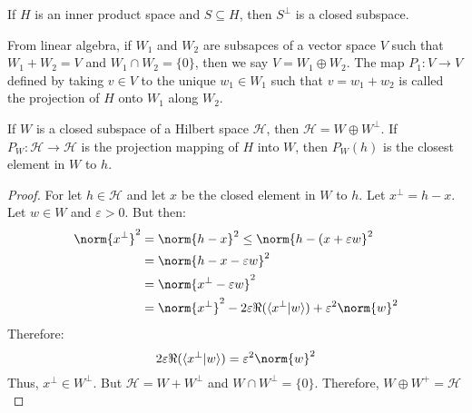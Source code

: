 \documentclass[crop=false,class=book,oneside]{standalone}                      %
\begin{document}
        \begin{theorem}
            If $H$ is an inner product space and
            $S\subseteq{H}$, then $S^{\perp}$ is a closed
            subspace.
        \end{theorem}
        From linear algebra, if $W_{1}$ and $W_{2}$ are
        subsapces of a vector space $V$ such that
        $W_{1}+W_{2}=V$ and $W_{1}\cap{W}_{2}=\{0\}$, then
        we say $V=W_{1}\oplus{W}_{2}$. The map
        $P_{1}:V\rightarrow{V}$ defined by taking $v\in{V}$ to
        the unique $w_{1}\in{W}_{1}$ such that
        $v=w_{1}+w_{2}$ is called the projection of $H$
        onto $W_{1}$ along $W_{2}$.
        \begin{theorem}
            If $W$ is a closed subspace of a Hilbert space
            $\mathcal{H}$, then
            $\mathcal{H}=W\oplus{W}^{\perp}$. If
            $P_{W}:\mathcal{H}\rightarrow\mathcal{H}$ is the
            projection mapping of $H$ into $W$, then
            $P_{W}(h)$ is the closest element in $W$ to $h$.
        \end{theorem}
        \begin{proof}
            For let $h\in\mathcal{H}$ and let $x$ be the
            closed element in $W$ to $h$. Let
            $x^{\perp}=h-x$. Let $w\in{W}$ and
            $\varepsilon>0$. But then:
            \begin{subequations}
                \begin{align}
                    \norm{x^{\perp}}^{2}
                    &=\norm{h-x}^{2}\leq
                    \norm{h-(x+\varepsilon{w}}^{2}\\
                    &=\norm{h-x-\varepsilon{w}}^{2}\\
                    &=\norm{x^{\perp}-\varepsilon{w}}^{2}\\
                    &=\norm{x^{\perp}}^{2}-
                    2\varepsilon\Re(\langle{x^{\perp}|w}\rangle)
                    +\varepsilon^{2}\norm{w}^{2}
                \end{align}
            \end{subequations}
            Therefore:
            \begin{equation}
                2\varepsilon\Re(\langle{x^{\perp}|w}\rangle)
                =\varepsilon^{2}\norm{w}^{2}
            \end{equation}
            Thus, $x^{\perp}\in{W}^{\perp}$. But
            $\mathcal{H}=W+W^{\perp}$ and
            $W\cap{W}^{\perp}=\{0\}$.
            Therefore, $W\oplus{W}^{+}=\mathcal{H}$
        \end{proof}
\end{document}
